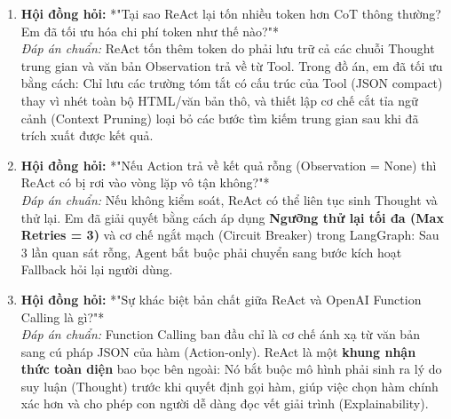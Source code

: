 \documentclass[11pt,a4paper]{article}
\begin{document}
\begin{deepdivebox}
\begin{enumerate}[leftmargin=1.5em]
    \item \textbf{Hội đồng hỏi:} *"Tại sao ReAct lại tốn nhiều token hơn CoT thông thường? Em đã tối ưu hóa chi phí token như thế nào?"*\\
    \textit{Đáp án chuẩn:} ReAct tốn thêm token do phải lưu trữ cả các chuỗi Thought trung gian và văn bản Observation trả về từ Tool. Trong đồ án, em đã tối ưu bằng cách: Chỉ lưu các trường tóm tắt có cấu trúc của Tool (JSON compact) thay vì nhét toàn bộ HTML/văn bản thô, và thiết lập cơ chế cắt tỉa ngữ cảnh (Context Pruning) loại bỏ các bước tìm kiếm trung gian sau khi đã trích xuất được kết quả.
    
    \item \textbf{Hội đồng hỏi:} *"Nếu Action trả về kết quả rỗng (Observation = None) thì ReAct có bị rơi vào vòng lặp vô tận không?"*\\
    \textit{Đáp án chuẩn:} Nếu không kiểm soát, ReAct có thể liên tục sinh Thought và thử lại. Em đã giải quyết bằng cách áp dụng \textbf{Ngưỡng thử lại tối đa (Max Retries = 3)} và cơ chế ngắt mạch (Circuit Breaker) trong LangGraph: Sau 3 lần quan sát rỗng, Agent bắt buộc phải chuyển sang bước kích hoạt Fallback hỏi lại người dùng.

    \item \textbf{Hội đồng hỏi:} *"Sự khác biệt bản chất giữa ReAct và OpenAI Function Calling là gì?"*\\
    \textit{Đáp án chuẩn:} Function Calling ban đầu chỉ là cơ chế ánh xạ từ văn bản sang cú pháp JSON của hàm (Action-only). ReAct là một \textbf{khung nhận thức toàn diện} bao bọc bên ngoài: Nó bắt buộc mô hình phải sinh ra lý do suy luận (Thought) trước khi quyết định gọi hàm, giúp việc chọn hàm chính xác hơn và cho phép con người dễ dàng đọc vết giải trình (Explainability).
\end{enumerate}
\end{deepdivebox}
\end{document}

